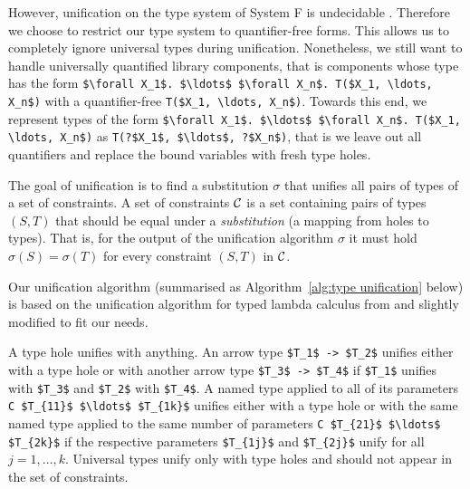 However, unification on the type system of System F is undecidable \cite{Huet1975}.
Therefore we choose to restrict our type system to quantifier-free forms.
This allows us to completely ignore universal types during unification. Nonetheless, we still want to handle universally quantified library components, that is components whose type has the form \lstinline?$\forall X_1$. $\ldots$ $\forall X_n$. T($X_1, \ldots, X_n$)? with a quantifier-free \lstinline?T($X_1, \ldots, X_n$)?. Towards this end, we represent types of the form \lstinline?$\forall X_1$. $\ldots$ $\forall X_n$. T($X_1, \ldots, X_n$)? as \lstinline!T(?$X_1$, $\ldots$, ?$X_n$)!, that is we leave out all quantifiers and replace the bound variables with fresh type holes.

The goal of unification is to find a substitution $\sigma$ that unifies all pairs of types of a set of constraints.
A set of constraints $\mathcal{C}$ is a set containing pairs of types $(S, T)$ that should be equal under a \emph{substitution} (a mapping from holes to types). That is, for the output of the unification algorithm $\sigma$ it must hold $\sigma(S) = \sigma(T)$ for every constraint $(S, T)$ in $\mathcal{C}$.

Our unification algorithm (summarised as Algorithm~\ref{alg:type unification} below) is based on the unification algorithm for typed lambda calculus from \cite{pierce2002types} and slightly modified to fit our needs.

A type hole unifies with anything. An arrow type \lstinline?$T_1$ -> $T_2$? unifies either with a type hole or with another arrow type \lstinline?$T_3$ -> $T_4$? if \lstinline?$T_1$? unifies with \lstinline?$T_3$? and \lstinline?$T_2$? with \lstinline?$T_4$?. A named type applied to all of its parameters \lstinline?C $T_{11}$ $\ldots$ $T_{1k}$? unifies either with a type hole or with the same named type applied to the same number of parameters \lstinline?C $T_{21}$ $\ldots$ $T_{2k}$? if the respective parameters \lstinline?$T_{1j}$? and \lstinline?$T_{2j}$? unify for all $j = 1, \ldots, k$. Universal  types unify only with type holes and should not appear in the set of constraints.

